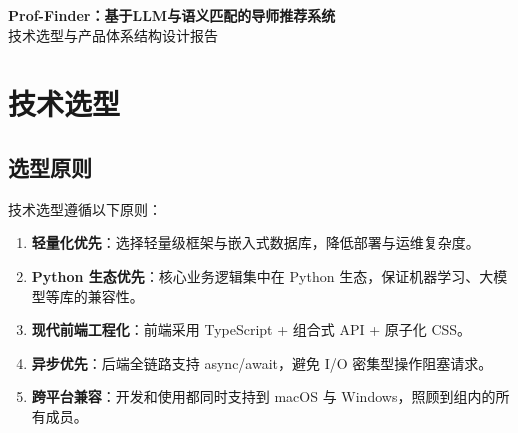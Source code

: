 \documentclass[11pt]{article}
\begin{document}
\begin{center}
{\LARGE\bfseries Prof-Finder：基于LLM与语义匹配的导师推荐系统} \\[6pt]
{\large 技术选型与产品体系结构设计报告}
\end{center}

\vspace{5mm}

\section{技术选型}

\subsection{选型原则}

技术选型遵循以下原则：

\begin{enumerate}
    \item \textbf{轻量化优先}：选择轻量级框架与嵌入式数据库，降低部署与运维复杂度。
    \item \textbf{Python 生态优先}：核心业务逻辑集中在 Python 生态，保证机器学习、大模型等库的兼容性。
    \item \textbf{现代前端工程化}：前端采用 TypeScript + 组合式 API + 原子化 CSS。
    \item \textbf{异步优先}：后端全链路支持 async/await，避免 I/O 密集型操作阻塞请求。
    \item \textbf{跨平台兼容}：开发和使用都同时支持到 macOS 与 Windows，照顾到组内的所有成员。
\end{enumerate}
\end{document}

